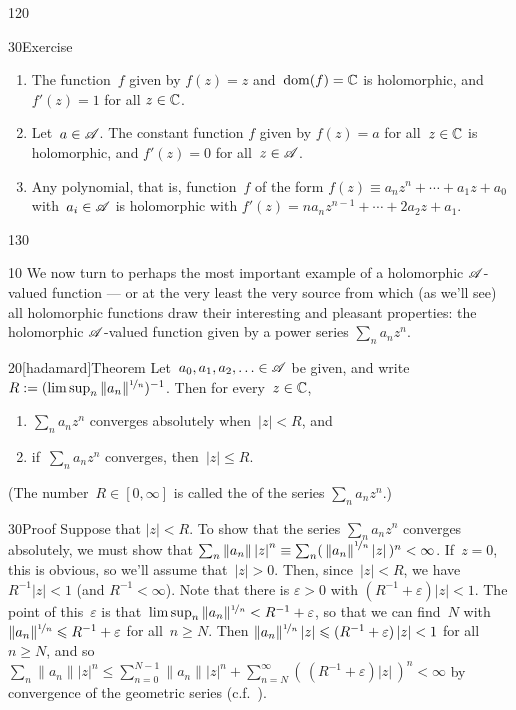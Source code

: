 \begin{parsec}{120}
\begin{point}{30}{Exercise}
\begin{enumerate}
\item
The function~$f$ given by $f(z)=z$ and~$\dom(f)=\C$
is holomorphic, and $f'(z)=1$ for all $z\in\C$.

\item
Let~$a\in \scrA$. The constant function $f$ given by $f(z)=a$
for all~$z\in \C$ is holomorphic, and $f'(z)=0$ for all~$z\in \scrA$.

\item
Any polynomial,
that is, function~$f$ of the form $f(z)\equiv a_n z^n+\dotsb+a_1 z+a_0$
with~$a_i\in \scrA$
is holomorphic with $f'(z)=na_nz^{n-1}+\dotsb+2a_2z+a_1$.
\end{enumerate}
\end{point}
\end{parsec}

\begin{parsec}{130}%
\begin{point}{10}%
We now turn
to perhaps the most important example
of a holomorphic $\scrA$-valued function ---
or at the very least the very source from
which (as we'll see) all holomorphic functions
draw their interesting and pleasant
properties:
the holomorphic $\scrA$-valued function
given by a power series  $\sum_n a_n z^n$.
\end{point}
\begin{point}{20}[hadamard]{Theorem}%
%
Let~$a_0,a_1,a_2,\dotsc\in\scrA$
be given,
and write~$R:=(\limsup_n \|a_n\|^{\nicefrac{1}{n}})^{-1}$.
Then for every~$z\in\C$,
\begin{enumerate}
\item
$\sum_n a_n z^n$
converges absolutely
when~$\left|z\right| < R$, and 
\item
if~$\sum_n a_n z^n$ converges,
then~$\left|z\right|\leq R$.
\end{enumerate}
(The number~$R\in[0,\infty]$ is called the %
of the series $\sum_n a_n z^n$.)
\begin{point}{30}{Proof}%
Suppose that $\left|z\right|<R$.
To show that the series 
$\sum_n a_nz^n$ converges absolutely,
we must show that $\sum_n \left\|a_n\right\|\left|z\right|^n
\equiv \sum_n (\,\left\|a_n\right\|^{\nicefrac{1}{n}}\left|z\right|\,)^n
<\infty$.
If~$z=0$, this is obvious,
so we'll assume that~$\left|z\right| > 0$.
Then, since~$\left|z\right|<R$,
we have~$R^{-1}\left|z\right|<1$
(and $R^{-1}<\infty$).
Note that
there is $\varepsilon>0$ with $(R^{-1}+\varepsilon)\left|z\right|<1$.
The point of this~$\varepsilon$
is that~$\limsup_n \|a_n\|^{\nicefrac{1}{n}} 
< R^{-1}+\varepsilon$,
so that we can find~$N$ 
with $\|a_n\|^{\nicefrac{1}{n}} \leq R^{-1}+\varepsilon$
for all~$n\geq N$.
Then $\|a_n\|^{\nicefrac{1}{n}}\left|z\right|
\leq (R^{-1}+\varepsilon)\left|z\right|<1$
for all~$n\geq N$,
and so
$\sum_n \|a_n\|\left|z\right|^n 
\leq\sum_{n=0}^{N-1} \|a_n\|\left|z\right|^n+ \sum_{n=N}^\infty 
(\,(R^{-1}+\varepsilon)\left|z\right|\,)^n < \infty$
by  convergence
of the geometric series (c.f.~).


\end{point}
\end{point}
\end{parsec}

